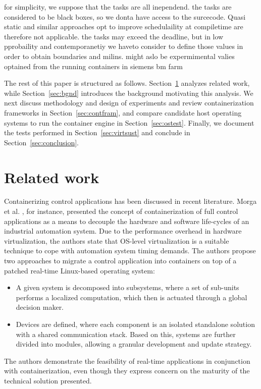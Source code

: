 \documentclass[]{scrartcl}
\begin{document}
for simplicity, we suppose that the tasks are all inependend. the tasks are considered to be black boxes, so we donta have access to the surcecode. 
Quasi static and similar approaches opt to improve schedulaility at compiletime are therefore not applicable.
the tasks may exceed the deadline, but in low pprobaility and contemporanetiy
we haveto consider to define those values in order to obtain boundaries and milins. might aslo be expermimental valies optained from the running containers in siemens bm farm


The rest of this paper is structured as follows. Section~\ref{sec:relwork} analyzes related work, while Section~\ref{sec:bgnd} introduces the background motivating this analysis. 
We next discuss methodology and design of experiments and review containerization frameworks in Section~\ref{sec:contfram}, and compare candidate host operating systems to run the container engine in Section~\ref{sec:ostest}. 
Finally, we document the tests performed in Section~\ref{sec:virtsust} and conclude in Section~\ref{sec:conclusion}.

\section{Related work}
\label{sec:relwork}

Containerizing control applications has been discussed in recent literature. 
Morga et al. \cite{Mogaetal2016}, for instance, presented the concept of containerization of full control applications as a means to decouple the hardware and software life-cycles of an industrial automation system.
Due to the performance overhead in hardware virtualization, the authors state that OS-level virtualization is a suitable technique to cope with automation system timing demands.
The authors propose two approaches to migrate a control application into containers on top of a patched real-time Linux-based operating system: 
\begin{itemize}
	\item A given system is decomposed into subsystems, where a set of sub-units performs a localized computation, which then is actuated through a global decision maker. 
	\item Devices are defined, where each component is an isolated standalone solution with a shared communication stack.
	Based on this, systems are further divided into modules, allowing a granular development and update strategy. 
\end{itemize}
The authors demonstrate the feasibility of real-time applications in conjunction with containerization, even though they express concern on the maturity of the technical solution presented.
\end{document}

